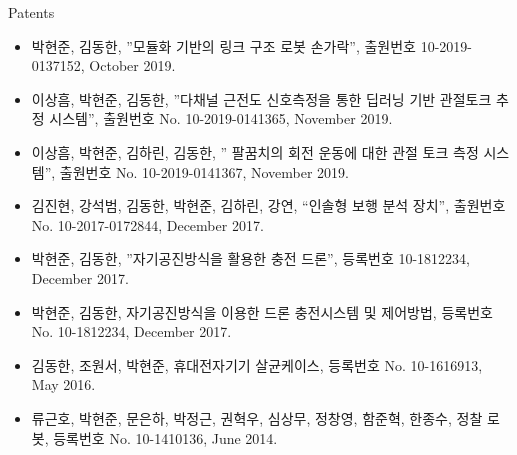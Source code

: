 \documentclass[a4paper,10pt]{article}
\newlength{\cvcolumngapwidth}
\newlength{\cvleftcolumnwidth}
\newlength{\cvrightcolumnwidth}
\newcommand{\cvheadingstyle}[1]{{\normalsize\cvheadingfont\textcolor{cvheadingcolor}{#1}}}
\newlength{\cvafteritemskipamount}
\newlength{\cvparskip}
\newcommand{\cvitem}[2]{
    \begin{minipage}[t]{\cvleftcolumnwidth}
        \raggedleft #1
    \end{minipage}%
    \hspace{\cvcolumngapwidth}%
    \begin{minipage}[t]{\cvrightcolumnwidth}
        \setlength{\parskip}{\cvparskip} #2
    \end{minipage}

    \vspace{\cvafteritemskipamount}
}
\begin{document}
\cvitem{
    \cvheadingstyle{Patents}
}{
    
    \begin{itemize}
    \item {\cvimportant 박현준}, 김동한, ”모듈화 기반의 링크 구조 로봇 손가락”, 출원번호 10-2019-0137152, October 2019.
    \item 이상흠, {\cvimportant 박현준}, 김동한, ”다채널 근전도 신호측정을 통한 딥러닝 기반 관절토크 추정 시스템”, 출원번호 No. 10-2019-0141365, November 2019.
    \item 이상흠, {\cvimportant 박현준}, 김하린, 김동한, ” 팔꿈치의 회전 운동에 대한 관절 토크 측정 시스템”, 출원번호 No. 10-2019-0141367, November 2019.
    \item 김진현, 강석범, 김동한, {\cvimportant 박현준}, 김하린, 강연, “인솔형 보행 분석 장치”, 출원번호 No. 10-2017-0172844, December 2017.
    \item {\cvimportant 박현준}, 김동한, ”자기공진방식을 활용한 충전 드론”, 등록번호 10-1812234, December 2017.
    \item {\cvimportant 박현준}, 김동한, 자기공진방식을 이용한 드론 충전시스템 및 제어방법, 등록번호 No. 10-1812234, December 2017.
    \item 김동한, 조원서, {\cvimportant 박현준}, 휴대전자기기 살균케이스, 등록번호 No. 10-1616913, May 2016.
    \item 류근호, {\cvimportant 박현준}, 문은하, 박정근, 권혁우, 심상무, 정창영, 함준혁, 한종수, 정찰 로봇, 등록번호 No. 10-1410136, June 2014.
    
            
    \end{itemize}
}
\end{document}
